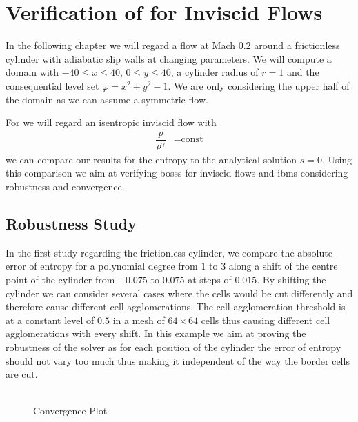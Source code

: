 \chapter{Verification of  for Inviscid Flows}
	\label{eulerVerification}
	In the following chapter we will regard a flow at Mach $0.2$ around a frictionless cylinder with adiabatic slip walls at changing parameters.
	We will compute a domain with  $-40 \leq x \leq 40$, $0 \leq y \leq 40$, a cylinder radius of $r = 1$ and the consequential level set $\varphi = x^2 + y^2 -1$. We are only considering the upper half of the domain as we can assume a symmetric flow. \\ \indent
	
	For we will regard an isentropic inviscid flow with 
	\begin{align}
			\dfrac{p}{\rho^\gamma} &= \text{const}
	\end{align}
	we can compare our results for the entropy to the analytical solution $s = 0$. Using this comparison we aim at verifying \gls{bosss} for inviscid flows and \gls{ibm}s considering robustness and convergence.
	
	\section{Robustness Study}
	In the first study regarding the frictionless cylinder, we compare the absolute error of entropy for a polynomial degree from $1$ to $3$ along a shift of the centre point of the cylinder from $-0.075$ to $0.075$ at steps of $0.015$. By shifting the cylinder we can consider several cases where the cells would be cut differently and therefore cause different cell agglomerations. The cell agglomeration threshold is at a constant level of $0.5$ in a mesh of $64 \times 64$ cells thus causing different cell agglomerations with every shift. In this example we aim at proving the robustness of the solver as for each position of the cylinder the error of entropy should not vary too much thus making it independent of the way the border cells are cut. \\ \\

	\begin{figure}[htp]	
		\centering
		\caption{Convergence Plot}
		\label{shifterror}
	\end{figure}
	

